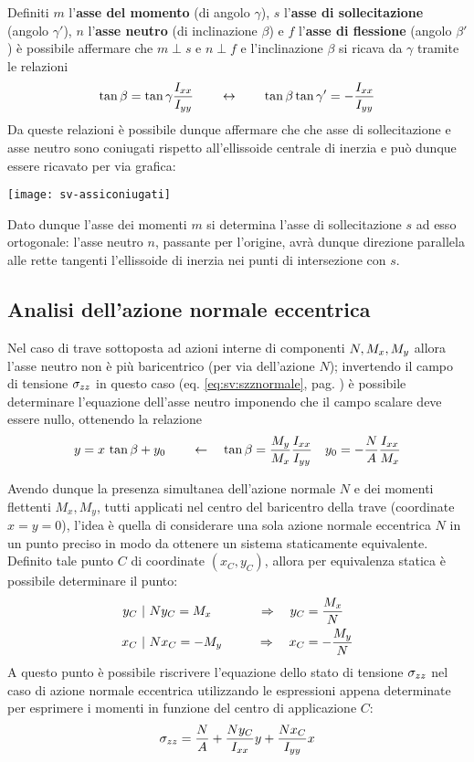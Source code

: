 		\begin{concetto}
			Definiti $m$ l'\textbf{asse del momento} (di angolo $\gamma$), $s$ l'\textbf{asse di sollecitazione} (angolo $\gamma'$), $n$ l'\textbf{asse neutro} (di inclinazione $\beta$) e $f$ l'\textbf{asse di flessione} (angolo $\beta'$) è possibile affermare che $m\perp s$ e $n\perp f$ e l'inclinazione $\beta$ si ricava da $\gamma$ tramite le relazioni
			\[ \tan\beta = \tan\gamma \frac {I_{xx}} {I_{yy}} \qquad \leftrightarrow\qquad \tan\beta \tan\gamma' = - \frac {I_{xx}} {I_{yy}} \]
			Da queste relazioni è possibile dunque affermare che che asse di sollecitazione e asse neutro sono coniugati rispetto all'ellissoide centrale di inerzia e può dunque essere ricavato per via grafica:
			\begin{center}
				\texttt{[image: sv-assiconiugati]}
			\end{center}			
		\end{concetto}
		Dato dunque l'asse dei momenti $m$ si determina l'asse di sollecitazione $s$ ad esso ortogonale: l'asse neutro $n$, passante per l'origine, avrà dunque direzione parallela alle rette tangenti l'ellissoide di inerzia nei punti di intersezione con $s$.
		
	\subsection{Analisi dell'azione normale eccentrica}
		Nel caso di trave sottoposta ad azioni interne di componenti $N, M_x,M_y$ allora l'asse neutro non è più baricentrico (per via dell'azione $N$); invertendo il campo di tensione $\sigma_{zz}$ in questo caso (eq. \ref{eq:sv:szznormale}, pag. \pageref{eq:sv:szznormale}) è possibile determinare l'equazione dell'asse neutro imponendo che il campo scalare deve essere nullo, ottenendo la relazione
		\[ y = x\, \tan\beta + y_0 \qquad \leftarrow\quad \tan\beta= \frac {M_y} {M_x} \frac {I_{xx}} {I_{yy}} \quad y_0 = - \frac N A \frac {I_{xx}} {M_x}  \]
		
	    Avendo dunque la presenza simultanea dell'azione normale $N$ e dei momenti flettenti $M_x,M_y$, tutti applicati nel centro del baricentro della trave (coordinate $x=y=0$), l'idea è quella di considerare una sola azione normale eccentrica $N$ in un punto preciso in modo da ottenere un sistema staticamente equivalente. Definito tale punto $C$ di coordinate $(x_C, y_C)$, allora per equivalenza statica è possibile determinare il punto:
	    \begin{align*}
	    	y_C \ &| \ N y_C = M_x \qquad  & \Rightarrow \quad y_C &= \frac {M_x} N \\
	    	x_C \ &| \ N x_C = -M_y \qquad & \Rightarrow \quad x_C &= - \frac {M_y} N 
	    \end{align*}
    	A questo punto è possibile riscrivere l'equazione dello stato di tensione $\sigma_{zz}$ nel caso di azione normale eccentrica utilizzando le espressioni appena determinate per esprimere i momenti in funzione del centro di applicazione $C$:
    	\[ \sigma_{zz} = \frac N A + \frac {Ny_C}{I_{xx}} y + \frac{Nx_C}{I_{yy}}x  \]
    	
    
    	    